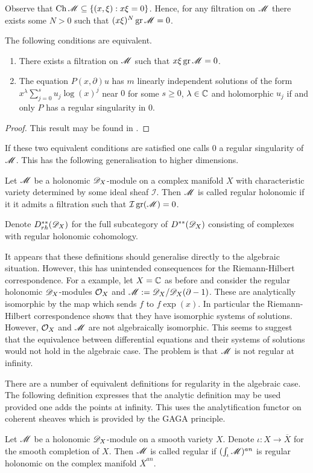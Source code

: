 Observe that $\operatorname{Ch} \mathscr{M}\subseteq \{(x,\xi): x\xi = 0\}$.
Hence, for any filtration on $\mathscr{M}$ there exists some $N>0$ such that
$(x\xi)^N \operatorname{gr}\mathscr{M} = 0 $.
\begin{proposition}
  The following conditions are equivalent.
  \begin{enumerate}
    \item There exists a filtration on $\mathscr{M}$ such that $x\xi\operatorname{gr}\mathscr{M} = 0$.
    \item The equation $P(x,\partial)u$ has $m$ linearly independent solutions of the form $x^\lambda \sum_{j=0}^s u_j \log(x)^j $
    near $0$ for some $s\geq 0$, $\lambda \in \mathbb{C}$ and holomorphic $u_j$ if and only $P$ has a regular singularity in $0$.
  \end{enumerate}
\end{proposition}
\begin{proof}
  This result may be found in \cite[Chapter 5]{kashiwara2003d}.
\end{proof}
If these two equivalent conditions are satisfied one calls $0$ a regular singularity of $\mathscr{M}$.
This has the following generalisation to higher dimensions.
\begin{definition}
   Let $\mathscr{M}$ be a holonomic $\mathscr{D}_X$-module on a complex manifold $X$ with characteristic variety determined by some ideal sheaf $\mathcal{I}$. Then $\mathscr{M}$ is called regular holonomic if it it admits a filtration such that $\mathcal{I} \operatorname{gr}(\mathscr{M}) = 0$.
\end{definition}
Denote $D^{**}_{rh}(\mathscr{D}_X)$ for the full subcategory of $D^{**}(\mathscr{D}_X)$ consisting of complexes with regular holonomic cohomology.

It appears that these definitions should generalise directly to the algebraic situation.
However, this has unintended consequences for the Riemann-Hilbert correspondence.
For a example, let $X = \mathbb{C}$ as before and consider the regular holonomic $\mathscr{D}_X$-modules $\mathcal{O}_X$ and $\mathscr{M} := \mathscr{D}_X/\mathscr{D}_X(\partial - 1)$.
These are analytically isomorphic by the map which sends $f$ to $f\exp(x)$.
In particular the Riemann-Hilbert correspondence shows that they have isomorphic systems of solutions.
However, $\mathcal{O}_X$ and $\mathscr{M}$ are not algebraically isomorphic.
This seems to suggest that the equivalence between differential equations and their systems of solutions would not hold in the algebraic case.
The problem is that $\mathscr{M}$ is not regular at infinity.

There are a number of equivalent definitions for regularity in the algebraic case.
The following definition expresses that the analytic definition may be used provided one adds the points at infinity.
This uses the analytification functor on coherent sheaves which is provided by the GAGA principle.
\begin{definition}
  Let $\mathscr{M}$ be a holonomic $\mathscr{D}_X$-module on a smooth variety $X$. Denote $\iota:X \to \overline{X}$ for the smooth completion of $X$. Then $\mathscr{M}$ is called regular if $(\int_\iota \mathscr{M})^{an}$ is regular holonomic on the complex manifold $\overline{X}^{an}$.
\end{definition}
